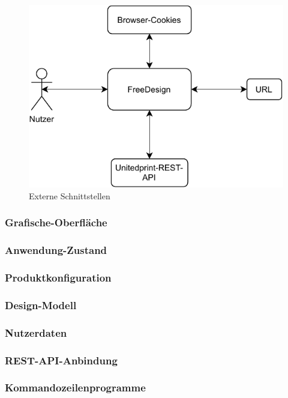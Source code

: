 \begin{figure}[H]
  \centering
  \includegraphics{diagrams/Ist-Architektur/Freedesign_Interaktion.pdf}
   \caption{Externe Schnittstellen}
   \label{fig:Externe_Schnittstellen}
\end{figure}


\subsubsection{Grafische-Oberfläche}

\subsubsection{Anwendung-Zustand}

\subsubsection{Produktkonfiguration}

\subsubsection{Design-Modell}

\subsubsection{Nutzerdaten}

\subsubsection{REST-API-Anbindung}

\subsubsection{Kommandozeilenprogramme}



